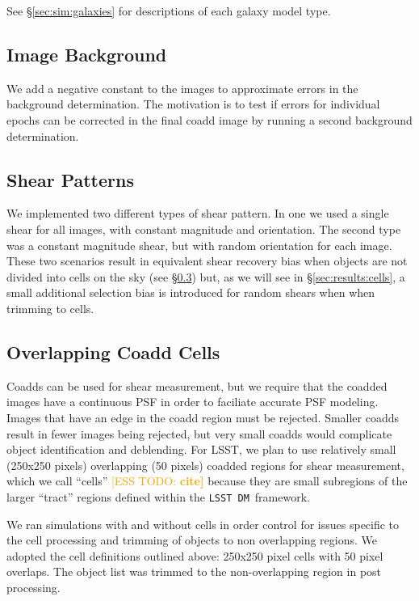 \documentclass[twocolumn,twocolappendix,astrosym]{openjournal}
\newcommand{\esstodo}[1]{\textcolor{orange}{[ESS TODO: \bf #1]}}
\newcommand{\dm}{\texttt{LSST DM}}
\begin{document}
See \S \ref{sec:sim:galaxies} for descriptions of each galaxy model type.

\subsection{Image Background} \label{sec:sim:bgerr}

We add a negative constant to the images to approximate errors in the
background determination.  The motivation is to test if errors for individual
epochs can be corrected in the final coadd image by running a second background
determination.

\subsection{Shear Patterns} \label{sec:sim:shears}

We implemented two different types of shear pattern.  In one we used a single
shear for all images, with constant magnitude and orientation.  The second type
was a constant magnitude shear, but with random orientation for each image.
These two scenarios result in equivalent shear recovery bias when objects are
not divided into cells on the sky (see \S \ref{sec:sim:cells}) but, as we will
see in \S \ref{sec:results:cells}, a small additional selection bias is
introduced for random shears when when trimming to cells.

\subsection{Overlapping Coadd Cells} \label{sec:sim:cells}

Coadds can be used for shear measurement\citep{ArmstrongCoadd}, but we
require that the coadded images have a continuous PSF in order to faciliate
accurate PSF modeling.  Images that have an edge in the coadd region must be
rejected.  Smaller coadds result in fewer images being rejected, but very small
coadds would complicate object identification and deblending.  For LSST, we plan to
use relatively small (250x250 pixels) overlapping (50 pixels) coadded regions
for shear measurement, which we call ``cells'' \esstodo{cite} because they
are small subregions of the larger ``tract'' regions defined within the
\dm\ framework.

We ran simulations with and without cells in order control for issues specific
to the cell processing and trimming of objects to non overlapping regions.  We
adopted the cell definitions outlined above: 250x250 pixel cells with 50 pixel
overlaps. The object list was trimmed to the non-overlapping region in post
processing.
\end{document}
